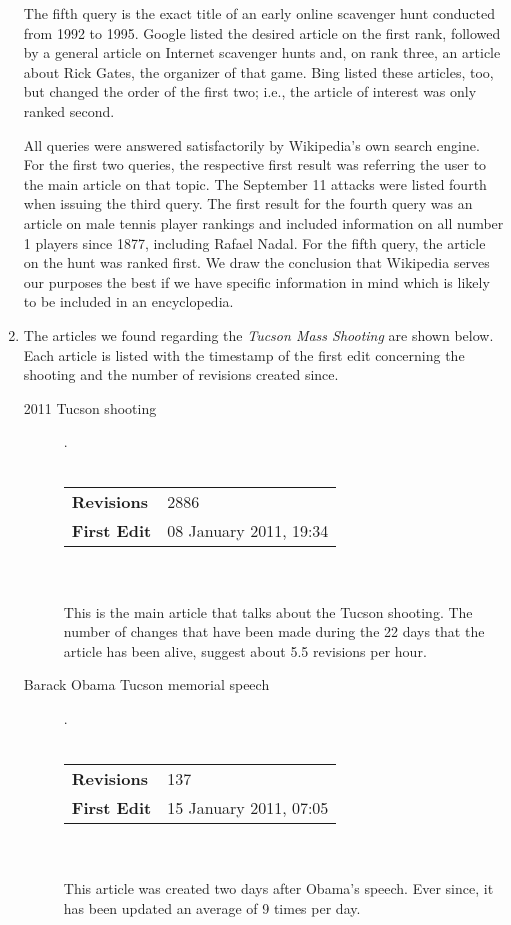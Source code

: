 \documentclass[a4paper,11pt,oneside]{book}
\begin{document}
\begin{enumerate}
	The fifth query is the exact title of an early online scavenger hunt conducted from 1992 to 1995. Google listed the desired article on the first rank, followed by a general article on Internet scavenger hunts and, on rank three, an article about Rick Gates, the organizer of that game. Bing listed these articles, too, but changed the order of the first two; i.e., the article of interest was only ranked second.
	
	All queries were answered satisfactorily by Wikipedia's own search engine. For the first two queries, the respective first result was referring the user to the main article on that topic. The September 11 attacks were listed fourth when issuing the third query. The first result for the fourth query was an article on male tennis player rankings and included information on all number 1 players since 1877, including Rafael Nadal. For the fifth query, the article on the hunt was ranked first. We draw the conclusion that Wikipedia serves our purposes the best if we have specific information in mind which is likely to be included in an encyclopedia.

	\item The articles we found regarding the {\it Tucson Mass Shooting} are shown below. Each article is listed with the timestamp of the first edit concerning the shooting and the number of revisions created since.

		\begin{description}
		\item [2011 Tucson shooting] .\\ \\
			\begin{tabular}{| l || l | } \hline
			  {\bf Revisions} & 2886 \\
			  {\bf First Edit} & 08 January 2011, 19:34 \\\hline
			\end{tabular}\\\\
This is the main article that talks about the Tucson shooting. The number of changes that have been made during the 22 days that the article has been alive, suggest about 5.5 revisions per hour.

		\item[Barack Obama Tucson memorial speech].\\\\
			\begin{tabular}{| l || l | } \hline
			  {\bf Revisions} & 137\\
			  {\bf First Edit} & 15 January 2011, 07:05\\	\hline
			\end{tabular} \\\\
	This article was created two days after Obama's speech. Ever since, it has been updated an average of 9 times per day.


\end{description}
\end{enumerate}
\end{document}
